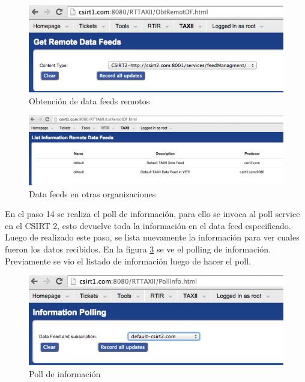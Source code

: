 \begin{figure}[h!]
	\centering
	\includegraphics[scale=0.5]{caso-de-estudio/obtremote.png}
	\caption{Obtención de data feeds remotos}
	\label{fig.obtremote}
\end{figure}

\begin{figure}[h!]
	\centering
	\includegraphics[scale=0.4]{caso-de-estudio/lstremotedf.png}
	\caption{Data feeds en otras organizaciones}
	\label{fig.lstremotedf}
\end{figure}

En el paso 14 se realiza el poll de información, para ello se invoca al poll service en el CSIRT 2, esto devuelve toda la información en el data feed especificado. Luego de realizado este paso, se lista nuevamente la información para ver cuales fueron los datos recibidos.
En la figura \ref{fig.pollinfo} se ve el polling de información. Previamente se vio el listado de información luego de hacer el poll.

\begin{figure}[h!]
	\centering
	\includegraphics[scale=0.4]{caso-de-estudio/pollinformacion.png}
	\caption{Poll de información}
	\label{fig.pollinfo}
\end{figure}

